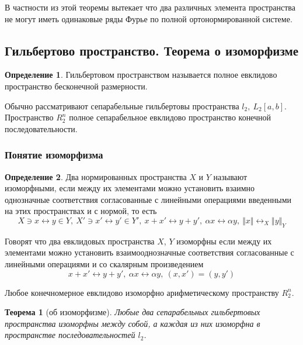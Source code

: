 \documentclass[14pt]{extarticle}
\newtheorem{theorem}{Теорема}[section]
\theoremstyle{definition}
\newtheorem{definition}{Определение}[section]
\theoremstyle{remark}
\renewcommand{\[}{\begin{dmath*}[compact]}
\renewcommand{\]}{\end{dmath*}}
\newcommand{\sep}{ , \ \allowbreak }
\begin{document}
В частности из этой теоремы вытекает что два различных элемента пространства
не могут иметь одинаковые ряды Фурье по полной ортонормированной системе.

\subsection{Гильбертово пространство. Теорема о изоморфизме}
\label{subsec:gp_toi}

\begin{definition}
  Гильбертовом пространством называется полное евклидово пространство
  бесконечной размерности.
\end{definition}

Обычно рассматривают сепарабельные гильбертовы пространства $l_2 \sep L_2[a,b]$.
Пространство $R_2^n$ полное сепарабельное евклидово пространство конечной
последовательности.

\subsubsection{Понятие изоморфизма}

\begin{definition}
  Два нормированных пространства $X$ и $Y$ называют изоморфными, если между
  их элементами можно установить взаимно однозначные соответствия
  согласованные с линейными операциями введенными на этих пространствах
  и с нормой, то есть
  \[{X\ni x \leftrightarrow y \in Y} \sep
  {X'\ni x' \leftrightarrow y' \in Y'} \sep
  {x + x' \leftrightarrow y + y'} \sep
  {\alpha x \leftrightarrow \alpha y} \sep
  {\Vert x \Vert \leftrightarrow_X \Vert y \Vert_Y}\]
\end{definition}

Говорят что два евклидовых пространства $X$, $Y$ изоморфны если между их
элементами можно установить взаимооднозначные соответствия согласованные
с линейными операциями и со скалярным произведением
\[{x+x' \leftrightarrow y + y'} \sep {\alpha x \leftrightarrow \alpha y}
\sep {(x,x')=(y,y')}\]

Любое конечномерное евклидово изоморфно арифметическому пространству $R_2^n$.

\begin{theorem}[об изоморфизме]
\label{th:об изоморфизме}
  Любые два сепарабельных гильбертовых пространства изоморфны между собой,
  а каждая из них изоморфна в пространстве последовательностей $l_2$.
\end{theorem}
\end{document}
